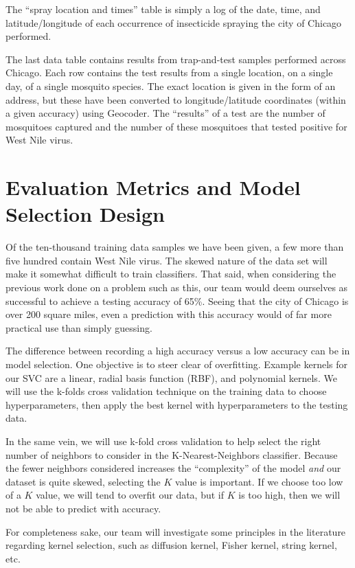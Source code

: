 \documentclass{article} %
\begin{document}
The ``spray location and times'' table is simply a log of the date, time, and latitude/longitude of each occurrence of insecticide spraying the city of Chicago performed.  

The last data table contains results from trap-and-test samples performed across Chicago.  Each row contains the test results from a single location, on a single day, of a single mosquito species.  The exact location is given in the form of an address, but these have been converted to longitude/latitude coordinates (within a given accuracy) using Geocoder.  The ``results'' of a test are the number of mosquitoes captured and the number of these mosquitoes that tested positive for West Nile virus.  

\section{Evaluation Metrics and Model Selection Design}

Of the ten-thousand training data samples we have been given, a few more than five hundred contain West Nile virus.  The skewed nature of the data set will make it somewhat difficult to train classifiers.  That said, when considering the previous work done on a problem such as this, our team would deem ourselves as successful to achieve a testing accuracy of 65\%.  Seeing that the city of Chicago is over 200 square miles, even a prediction with this accuracy would of far more practical use than simply guessing.  

The difference between recording a high accuracy versus a low accuracy can be in model selection.  One objective is to steer clear of overfitting.  Example kernels for our SVC are a linear, radial basis function (RBF), and polynomial kernels.  We will use the k-folds cross validation technique on the training data to choose hyperparameters, then apply the best kernel with hyperparameters to the testing data.  

In the same vein, we will use k-fold cross validation to help select the right number of neighbors to consider in the K-Nearest-Neighbors  classifier.  Because the fewer neighbors considered increases the ``complexity'' of the model \textit{and} our dataset is quite skewed, selecting the $K$ value is important.  If we choose too low of a $K$ value, we will tend to overfit our data, but if $K$ is too high, then we will not be able to predict with accuracy.

For completeness sake, our team will investigate some principles in the literature regarding kernel selection, such as diffusion kernel, Fisher kernel, string kernel, etc.
\end{document}
